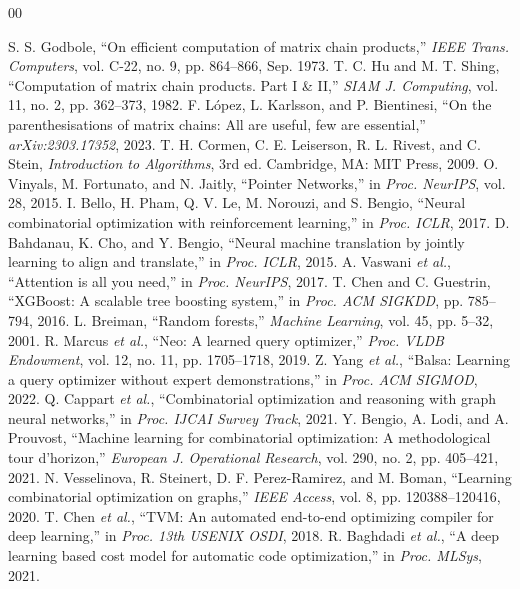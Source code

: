 \documentclass[conference]{IEEEtran}
\begin{document}
\begin{thebibliography}{00}

 S. S. Godbole, ``On efficient computation of matrix chain products,'' \emph{IEEE Trans. Computers}, vol. C-22, no. 9, pp. 864--866, Sep. 1973.
 T. C. Hu and M. T. Shing, ``Computation of matrix chain products. Part I \& II,'' \emph{SIAM J. Computing}, vol. 11, no. 2, pp. 362--373, 1982.
 F. L\'{o}pez, L. Karlsson, and P. Bientinesi, ``On the parenthesisations of matrix chains: All are useful, few are essential,'' \emph{arXiv:2303.17352}, 2023.
 T. H. Cormen, C. E. Leiserson, R. L. Rivest, and C. Stein, \emph{Introduction to Algorithms}, 3rd ed. Cambridge, MA: MIT Press, 2009.
 O. Vinyals, M. Fortunato, and N. Jaitly, ``Pointer Networks,'' in \emph{Proc. NeurIPS}, vol. 28, 2015.
 I. Bello, H. Pham, Q. V. Le, M. Norouzi, and S. Bengio, ``Neural combinatorial optimization with reinforcement learning,'' in \emph{Proc. ICLR}, 2017.
 D. Bahdanau, K. Cho, and Y. Bengio, ``Neural machine translation by jointly learning to align and translate,'' in \emph{Proc. ICLR}, 2015.
 A. Vaswani \emph{et al.}, ``Attention is all you need,'' in \emph{Proc. NeurIPS}, 2017.
 T. Chen and C. Guestrin, ``XGBoost: A scalable tree boosting system,'' in \emph{Proc. ACM SIGKDD}, pp. 785--794, 2016.
 L. Breiman, ``Random forests,'' \emph{Machine Learning}, vol. 45, pp. 5--32, 2001.
 R. Marcus \emph{et al.}, ``Neo: A learned query optimizer,'' \emph{Proc. VLDB Endowment}, vol. 12, no. 11, pp. 1705--1718, 2019.
 Z. Yang \emph{et al.}, ``Balsa: Learning a query optimizer without expert demonstrations,'' in \emph{Proc. ACM SIGMOD}, 2022.
 Q. Cappart \emph{et al.}, ``Combinatorial optimization and reasoning with graph neural networks,'' in \emph{Proc. IJCAI Survey Track}, 2021.
 Y. Bengio, A. Lodi, and A. Prouvost, ``Machine learning for combinatorial optimization: A methodological tour d'horizon,'' \emph{European J. Operational Research}, vol. 290, no. 2, pp. 405--421, 2021.
 N. Vesselinova, R. Steinert, D. F. Perez-Ramirez, and M. Boman, ``Learning combinatorial optimization on graphs,'' \emph{IEEE Access}, vol. 8, pp. 120388--120416, 2020.
 T. Chen \emph{et al.}, ``TVM: An automated end-to-end optimizing compiler for deep learning,'' in \emph{Proc. 13th USENIX OSDI}, 2018.
 R. Baghdadi \emph{et al.}, ``A deep learning based cost model for automatic code optimization,'' in \emph{Proc. MLSys}, 2021.

\end{thebibliography}
\end{document}
